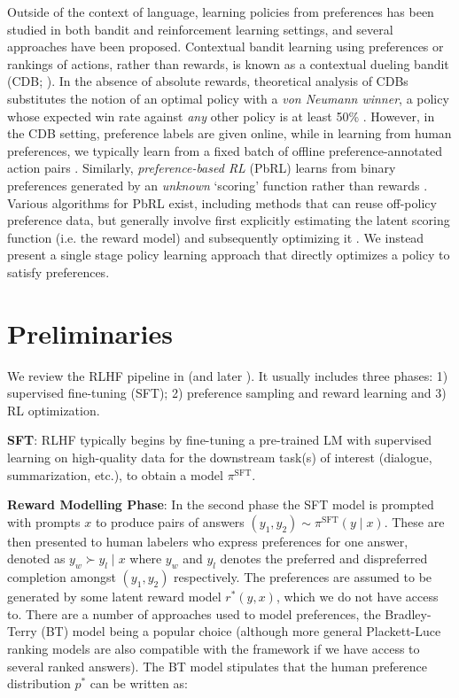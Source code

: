Outside of the context of language, learning policies from preferences has been studied in both bandit and reinforcement learning settings, and several approaches have been proposed. Contextual bandit learning using preferences or rankings of actions, rather than rewards, is known as a contextual dueling bandit (CDB; \cite{yue2012karmed,dudik2015contextual}). In the absence of absolute rewards, theoretical analysis of CDBs substitutes the notion of an optimal policy with a \textit{von Neumann winner}, a policy whose expected win rate against \textit{any} other policy is at least 50\% \citep{dudik2015contextual}. However, in the CDB setting, preference labels are given online, while in learning from human preferences, we typically learn from a fixed batch of offline preference-annotated action pairs \citep{yan2022human}. Similarly, \textit{preference-based RL} (PbRL) learns from binary preferences generated by an \textit{unknown} `scoring' function rather than rewards \citep{BusaFekete2014,ruiz2023dueling}. Various algorithms for PbRL exist, including methods that can reuse off-policy preference data, but generally involve first explicitly estimating the latent scoring function (i.e. the reward model) and subsequently optimizing it \citep{jain2013learning,BusaFekete2014,christiano2017deep,sadigh2017active,kupcsik2018learning}. We instead present a single stage policy learning approach that directly optimizes a policy to satisfy preferences.

\section{Preliminaries}\label{section:prelims}

We review the RLHF pipeline in \citeauthor{ziegler2020finetuning} (and later \citep{stiennon2022learning, bai2022training, ouyang2022training}). It usually includes three phases: 1) supervised fine-tuning (SFT); 2) preference sampling and reward learning and 3) RL optimization.

\textbf{SFT}: RLHF typically begins by fine-tuning a pre-trained LM with supervised learning on high-quality data for the downstream task(s) of interest (dialogue, summarization, etc.), to obtain a model $\pi^\text{SFT}$. 

\textbf{Reward Modelling Phase}: In the second phase the SFT model is prompted with prompts $x$ to produce pairs of answers $(y_1, y_2)\sim \pi^\text{SFT}(y \mid x)$. These are then presented to human labelers who express preferences for one answer, denoted as $y_w\succ y_l \mid x$ where $y_w$ and $y_l$ denotes the preferred and dispreferred completion amongst $(y_1, y_2)$ respectively. The preferences are assumed to be generated by some latent reward model $r^*(y, x)$, which we do not have access to. There are a number of approaches used to model preferences, the Bradley-Terry (BT) \cite{bradley1952rankanalysis} model being a popular choice (although more general Plackett-Luce ranking models \citep{plackett1975analysis, luce2012individual} are also compatible with the framework if we have access to several ranked answers). The BT model stipulates that the human preference distribution $p^*$ can be written as:

